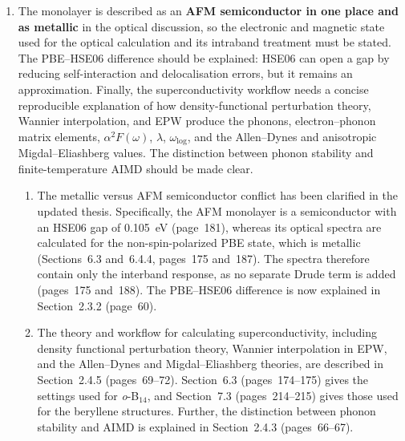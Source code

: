 \documentclass[12pt,a4paper]{article}
\newenvironment{reply}{\par\medskip\color{replyblue}}{\par\medskip}
\begin{document}
\begin{enumerate}[leftmargin=*]
\begin{reply}
Indeed, there is a small energy difference of 20~meV per 14-atom cell between the AFM and FM configurations.
Section~6.4.2.3 (page~181) now states that this is a zero-temperature energy comparison and that the magnetic ordering temperature requires a separate calculation.
Regarding the ``negative phonon frequencies'', it should be written as ``imaginary phonon frequencies'', and this has been changed on the two occasions in the caption of Fig.~5.21, now Fig.~6.21 (page~200).
The caption now gives numerical convergence and a physical instability as the two possible origins of these modes, in agreement with Section~6.4.2.2 (page~179).
Sections~6.4.2.2, 6.4.3, and~6.4.4 (pages~179, 186, and~190) also qualify the stability, superconductivity, and plasmon claims.
\end{reply}

\item The monolayer is described as an \textbf{AFM semiconductor in one place and as metallic} in the optical discussion, so the electronic and magnetic state used for the optical calculation and its intraband treatment must be stated. The PBE--HSE06 difference should be explained: HSE06 can open a gap by reducing self-interaction and delocalisation errors, but it remains an approximation. Finally, the superconductivity workflow needs a concise reproducible explanation of how density-functional perturbation theory, Wannier interpolation, and EPW produce the phonons, electron--phonon matrix elements, $\alpha^2F(\omega)$, $\lambda$, $\omega_{\log}$, and the Allen--Dynes and anisotropic Migdal--Eliashberg values. The distinction between phonon stability and finite-temperature AIMD should be made clear.

\begin{reply}
\begin{enumerate}[label=(\roman*),leftmargin=*]
\item The metallic versus AFM semiconductor conflict has been clarified in the updated thesis.
Specifically, the AFM monolayer is a semiconductor with an HSE06 gap of 0.105~eV (page~181), whereas its optical spectra are calculated for the non-spin-polarized PBE state, which is metallic (Sections~6.3 and~6.4.4, pages~175 and~187).
The spectra therefore contain only the interband response, as no separate Drude term is added (pages~175 and~188).
The PBE--HSE06 difference is now explained in Section~2.3.2 (page~60).
\item The theory and workflow for calculating superconductivity, including density functional perturbation theory, Wannier interpolation in EPW, and the Allen--Dynes and Migdal--Eliashberg theories, are described in Section~2.4.5 (pages~69--72).
Section~6.3 (pages~174--175) gives the settings used for \textit{o}-B$_{14}$, and Section~7.3 (pages~214--215) gives those used for the beryllene structures.
Further, the distinction between phonon stability and AIMD is explained in Section~2.4.3 (pages~66--67).
\end{enumerate}
\end{reply}


\end{enumerate}
\end{document}
